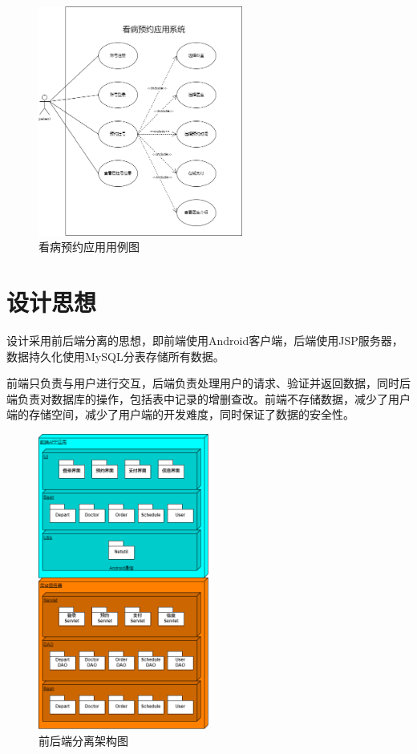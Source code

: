 \documentclass[UTF8,12pt]{article}
\begin{document}
\begin{figure}[htbp]
    \centering
    \includegraphics[width=0.6\textwidth]{imgs/1.png}
    \caption{看病预约应用用例图}
\end{figure}

\newpage

\section{设计思想}
设计采用前后端分离的思想，即前端使用Android客户端，后端使用JSP服务器，数据持久化使用MySQL分表存储所有数据。

前端只负责与用户进行交互，后端负责处理用户的请求、验证并返回数据，同时后端负责对数据库的操作，包括表中记录的增删查改。前端不存储数据，减少了用户端的存储空间，减少了用户端的开发难度，同时保证了数据的安全性。

\begin{figure}[htbp]
    \centering
    \includegraphics[width=0.5\textwidth]{imgs/2.png}
    \caption{前后端分离架构图}
\end{figure}
\end{document}

